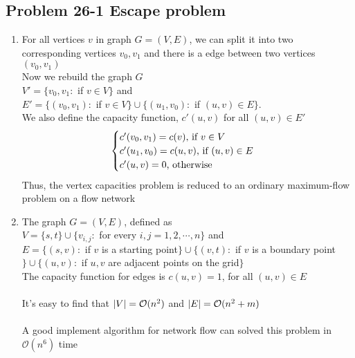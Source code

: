\subsection*{Problem 26-1 Escape problem}
\begin{enumerate}
	\item	For all vertices $v$ in graph $G = (V, E)$, we can split it into two corresponding vertices $v_0, v_1$ and there is a edge between two vertices $(v_0, v_1)$ \\
		Now we rebuild the graph $G$ \\
		$V' = \{v_0, v_1:$ if $v \in V\}$ and \\
		$E' = \{(v_0, v_1):$ if $v \in V\} \cup \{(u_1, v_0):$ if $(u, v) \in E\}$. \\
		We also define the capacity function, $c'(u, v)$ for all $(u, v) \in E'$ \\
		\begin{equation} \notag
		\begin{cases}
			c'(v_0, v_1) = c(v)$, if  $v \in V \\
			c'(u_1, v_0) = c(u, v)$, if $(u, v) \in E \\
			c'(u, v) = 0$, otherwise$
		\end{cases}
		\end{equation}
		Thus, the vertex capacities problem is reduced to an ordinary maximum-flow problem on a flow network
	\item	The graph $G = (V, E)$, defined as \\
		$V = \{s, t\} \cup \{v_{i,j}:$ for every $i, j = 1, 2, \cdots, n\}$ and \\
		$E = \{(s, v):$ if $v$ is a starting point$\} \cup \{(v, t):$ if $v$ is a boundary point$\} \cup \{(u, v):$ if $u, v$ are adjacent points on the grid$\}$ \\
		The capacity function for edges is $c(u, v) = 1$, for all $(u, v) \in E$ \\ \\
		It's easy to find that $\left\lvert V \right\rvert = \mathcal{O}(n^2)$ and $\left\lvert E \right\rvert = \mathcal{O}(n^2 + m)$ \\ \\
		A good implement algorithm for network flow can solved this problem in $\mathcal{O}(n^6)$ time
		
\end{enumerate}

